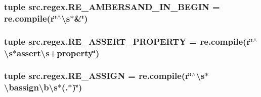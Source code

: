 \hypertarget{namespacesrc_1_1regex_ab87ee1ae93d242626458645c69dd20e1}{
\subsubsection[{R\-E\-\_\-\-A\-M\-B\-E\-R\-S\-A\-N\-D\-\_\-\-I\-N\-\_\-\-B\-E\-G\-I\-N}]{\setlength{\rightskip}{0pt plus 5cm}tuple src.\-regex.\-R\-E\-\_\-\-A\-M\-B\-E\-R\-S\-A\-N\-D\-\_\-\-I\-N\-\_\-\-B\-E\-G\-I\-N = re.\-compile(r\char`\"{}$^\wedge$\textbackslash{}s$\ast$\&\char`\"{})}}\label{namespacesrc_1_1regex_ab87ee1ae93d242626458645c69dd20e1}
\hypertarget{namespacesrc_1_1regex_a7069179868eeea3e9ac3b3e6a3a1e014}{
\subsubsection[{R\-E\-\_\-\-A\-S\-S\-E\-R\-T\-\_\-\-P\-R\-O\-P\-E\-R\-T\-Y}]{\setlength{\rightskip}{0pt plus 5cm}tuple src.\-regex.\-R\-E\-\_\-\-A\-S\-S\-E\-R\-T\-\_\-\-P\-R\-O\-P\-E\-R\-T\-Y = re.\-compile(r\char`\"{}$^\wedge$\textbackslash{}s$\ast$assert\textbackslash{}s+property\char`\"{})}}\label{namespacesrc_1_1regex_a7069179868eeea3e9ac3b3e6a3a1e014}
\hypertarget{namespacesrc_1_1regex_afa3544b597c3ba3e73bb4da32cbb1dfd}{
\subsubsection[{R\-E\-\_\-\-A\-S\-S\-I\-G\-N}]{\setlength{\rightskip}{0pt plus 5cm}tuple src.\-regex.\-R\-E\-\_\-\-A\-S\-S\-I\-G\-N = re.\-compile(r\char`\"{}$^\wedge$\textbackslash{}s$\ast$\textbackslash{}bassign\textbackslash{}b\textbackslash{}s$\ast$(.$\ast$)\char`\"{})}}\label{namespacesrc_1_1regex_afa3544b597c3ba3e73bb4da32cbb1dfd}
